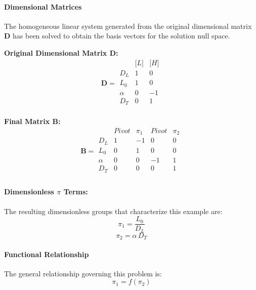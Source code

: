                \paragraph{Dimensional Matrices}
                The homogeneous linear system generated from the original dimensional matrix $\mathbf{D}$ has been solved to obtain the basis vectors for the solution null space.

                \textbf{Original Dimensional Matrix $\mathbf{D}$:}
                \[\mathbf{D} = \begin{array}{r|rr}
                & \text{[}L\text{]} & \text{[}H\text{]} \\
                \hline
                D_L & 1 & 0 \\
L_0 & 1 & 0 \\
\alpha & 0 & -1 \\
D_T & 0 & 1 \\

                \end{array}\]


        \textbf{Final Matrix $\mathbf{B}$:}
        \[\mathbf{B} = \begin{array}{r|rrrr}
        & Pivot & \pi_{1} & Pivot & \pi_{2} \\
        \hline
        D_L & 1 & -1 & 0 & 0 \\
L_0 & 0 & 1 & 0 & 0 \\
\alpha & 0 & 0 & -1 & 1 \\
D_T & 0 & 0 & 0 & 1 \\

        \end{array}\]

        \paragraph{Dimensionless $\pi$ Terms: }
        The resulting dimensionless groups that characterize this example are:
\begin{equation}
\pi_{1} = \frac{L_0}{D_L}
\end{equation}
\begin{equation}
\pi_{2} = \alpha \, D_T
\end{equation}

                    \paragraph{Functional Relationship}
                    The general relationship governing this problem is:
                    \begin{equation}
                    \pi_1 = f(\pi_2)
                    \end{equation}

